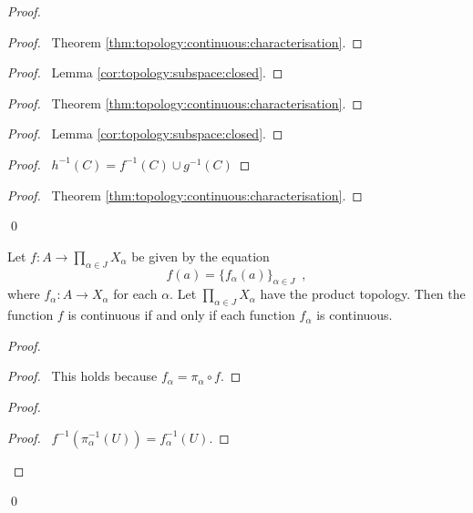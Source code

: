 \begin{proof}
  \pf
  \begin{proof}
    \pf\ Theorem \ref{thm:topology:continuous:characterisation}.
  \end{proof}
  \begin{proof}
    \pf\ Lemma \ref{cor:topology:subspace:closed}.
  \end{proof}
  \begin{proof}
    \pf\ Theorem \ref{thm:topology:continuous:characterisation}.
  \end{proof}
  \begin{proof}
    \pf\ Lemma \ref{cor:topology:subspace:closed}.
  \end{proof}
  \begin{proof}
    \pf\ $h^{-1}(C) = f^{-1}(C) \cup g^{-1}(C)$
  \end{proof}
  \qedstep
  \begin{proof}
    \pf\ Theorem \ref{thm:topology:continuous:characterisation}.
  \end{proof}
  \qed
\end{proof}

\begin{thm}
  \label{thm:topology:continuous:product}
  Let $f : A \rightarrow \prod_{\alpha \in J} X_\alpha$ be given by the
  equation
  \[ f(a) = \{ f_\alpha(a) \}_{\alpha \in J} \enspace , \]
  where $f_\alpha : A \rightarrow X_\alpha$ for each $\alpha$. Let
  $\prod_{\alpha
    \in J} X_\alpha$ have the product topology. Then the function $f$ is
  continuous if and only if each function $f_\alpha$ is continuous.
\end{thm}

\begin{proof}
  \pf
  \begin{proof}
    \pf\ This holds because $f_\alpha = \pi_\alpha \circ f$.
  \end{proof}
  \begin{proof}
    \begin{proof}
      \pf\ $f^{-1}(\pi_\alpha^{-1}(U)) = f_\alpha^{-1}(U)$.
    \end{proof}
  \end{proof}
  \qed
\end{proof}



